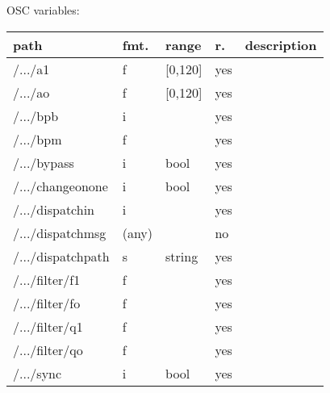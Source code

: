 \begin{snugshade}
{\footnotesize
\label{osctab:tascarapmetronome}
OSC variables:
\nopagebreak

\begin{tabularx}{\textwidth}{llllX}
\hline
path & fmt. & range & r. & description\\
\hline
/.../a1 & f & [0,120] & yes & \\
/.../ao & f & [0,120] & yes & \\
/.../bpb & i &  & yes & \\
/.../bpm & f &  & yes & \\
/.../bypass & i & bool & yes & \\
/.../changeonone & i & bool & yes & \\
/.../dispatchin & i &  & yes & \\
/.../dispatchmsg & (any) &  & no & \\
/.../dispatchpath & s & string & yes & \\
/.../filter/f1 & f &  & yes & \\
/.../filter/fo & f &  & yes & \\
/.../filter/q1 & f &  & yes & \\
/.../filter/qo & f &  & yes & \\
/.../sync & i & bool & yes & \\
\hline
\end{tabularx}
}
\end{snugshade}

